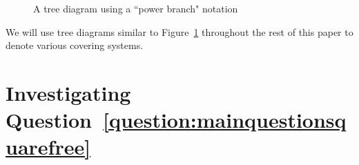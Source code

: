 \documentclass[12pt]{article}
\newtheorem{lemma}[theorem]{Lemma}
\theoremstyle{definition}
\renewcommand{\mod}[2]{#1\textup{ (mod }#2\textup{)}}
\begin{document}
\begin{figure}[H]
\centering
\begin{minipage}{0.45\textwidth}
\centering
{}
\caption{Repeated subtree from Figure~\ref{fig:highpower}}
\label{fig:subtree}
\end{minipage}\qquad
\begin{minipage}{0.45\textwidth}
\centering
{}
\caption{A tree diagram using a ``power branch" notation}
\label{fig:highpowercondensed}
\end{minipage}
\end{figure}

We will use tree diagrams similar to Figure~\ref{fig:highpowercondensed} throughout the rest of this paper to denote various covering systems.








\section{Investigating Question~\ref{question:mainquestionsquarefree}}\label{sec:squarefree}

%
\end{document}
